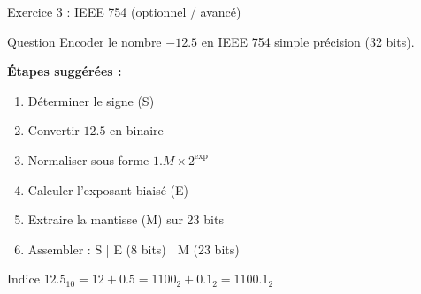 \documentclass[aspectratio=1610]{beamer}
\begin{document}
\begin{frame}{Exercice 3 : IEEE 754 (optionnel / avancé)}

  \begin{exampleblock}{Question}
    Encoder le nombre $-12.5$ en IEEE 754 simple précision (32 bits).
  \end{exampleblock}

  \vspace{0.3cm}

  \textbf{Étapes suggérées :}

  \begin{enumerate}
    \item Déterminer le signe (S)
    \item Convertir $12.5$ en binaire
    \item Normaliser sous forme $1.M \times 2^{\text{exp}}$
    \item Calculer l'exposant biaisé (E)
    \item Extraire la mantisse (M) sur 23 bits
    \item Assembler : S | E (8 bits) | M (23 bits)
  \end{enumerate}

  \vspace{0.3cm}

  \pause

  \begin{alertblock}{Indice}
    $12.5_{10} = 12 + 0.5 = 1100_2 + 0.1_2 = 1100.1_2$
  \end{alertblock}

\end{frame}
\end{document}
